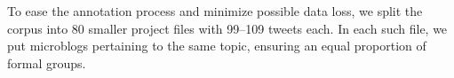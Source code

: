 
To ease the annotation process and minimize possible data loss, we
split the corpus into 80 smaller project files with \numrange{99}{109}
tweets each.  In each such file, we put microblogs pertaining to the
same topic, ensuring an equal proportion of formal groups.









